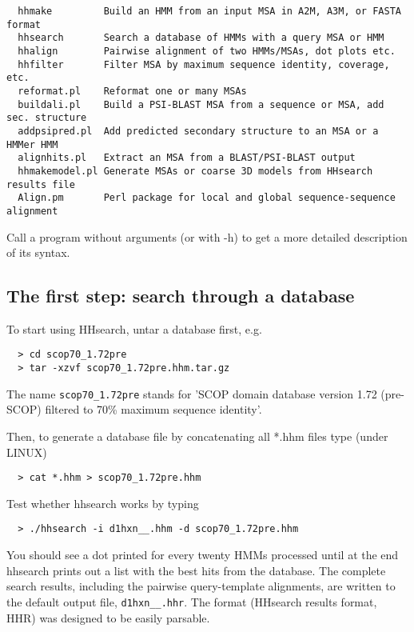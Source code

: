 \documentclass[11pt,a4paper]{article}
\begin{document}
\small \begin{verbatim}
  hhmake         Build an HMM from an input MSA in A2M, A3M, or FASTA format 
  hhsearch       Search a database of HMMs with a query MSA or HMM
  hhalign        Pairwise alignment of two HMMs/MSAs, dot plots etc.
  hhfilter       Filter MSA by maximum sequence identity, coverage, etc.  
  reformat.pl    Reformat one or many MSAs
  buildali.pl    Build a PSI-BLAST MSA from a sequence or MSA, add sec. structure
  addpsipred.pl  Add predicted secondary structure to an MSA or a HMMer HMM
  alignhits.pl   Extract an MSA from a BLAST/PSI-BLAST output
  hhmakemodel.pl Generate MSAs or coarse 3D models from HHsearch results file	
  Align.pm       Perl package for local and global sequence-sequence alignment
\end{verbatim} \normalsize

Call a program without arguments (or with -h) to get a more detailed description of 
its syntax.


\subsection{The first step: search through a database}

To start using HHsearch, untar a database first, e.g.
\begin{verbatim}
  > cd scop70_1.72pre
  > tar -xzvf scop70_1.72pre.hhm.tar.gz
\end{verbatim}

The name \verb`scop70_1.72pre` stands for 'SCOP domain database version 1.72 (pre-SCOP) 
filtered to 70\% maximum sequence identity'.

Then, to generate a database file by concatenating all *.hhm files type (under LINUX)
\begin{verbatim}
  > cat *.hhm > scop70_1.72pre.hhm
\end{verbatim}

Test whether hhsearch works by typing
\begin{verbatim}
  > ./hhsearch -i d1hxn__.hhm -d scop70_1.72pre.hhm
\end{verbatim}

You should see a dot printed for every twenty HMMs processed until at the end 
hhsearch prints out a list with the best hits from the database. The complete 
search results, including the pairwise query-template alignments, are written to the 
default output file, \verb`d1hxn__.hhr`. The format (HHsearch results format, HHR) was 
designed to be easily parsable.
\end{document}
